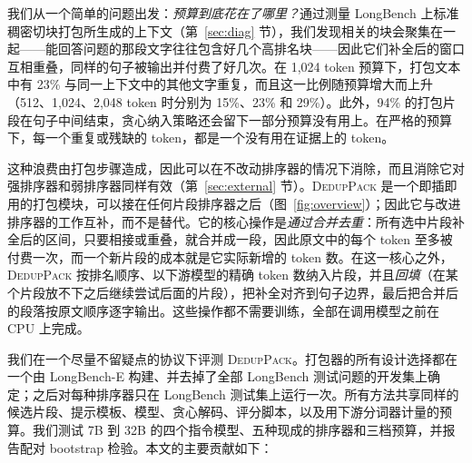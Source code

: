 \documentclass[11pt]{article}
\newcommand{\spk}{\textsc{DedupPack}}
\begin{document}
我们从一个简单的问题出发：\emph{预算到底花在了哪里？}通过测量 LongBench 上标准稠密切块打包所生成的上下文（第~\ref{sec:diag} 节），我们发现相关的块会聚集在一起——能回答问题的那段文字往往包含好几个高排名块——因此它们补全后的窗口互相重叠，同样的句子被输出并付费了好几次。在 1,024 token 预算下，打包文本中有 23\% 与同一上下文中的其他文字重复，而且这一比例随预算增大而上升（512、1,024、2,048 token 时分别为 15\%、23\% 和 29\%）。此外，94\% 的打包片段在句子中间结束，贪心纳入策略还会留下一部分预算没有用上。在严格的预算下，每一个重复或残缺的 token，都是一个没有用在证据上的 token。

这种浪费由打包步骤造成，因此可以在不改动排序器的情况下消除，而且消除它对强排序器和弱排序器同样有效（第~\ref{sec:external} 节）。\spk{} 是一个即插即用的打包模块，可以接在任何片段排序器之后（图~\ref{fig:overview}）；因此它与改进排序器的工作互补，而不是替代。它的核心操作是\emph{通过合并去重}：所有选中片段补全后的区间，只要相接或重叠，就合并成一段，因此原文中的每个 token 至多被付费一次，而一个新片段的成本就是它实际新增的 token 数。在这一核心之外，\spk{} 按排名顺序、以下游模型的精确 token 数纳入片段，并且\emph{回填}（在某个片段放不下之后继续尝试后面的片段），把补全对齐到句子边界，最后把合并后的段落按原文顺序逐字输出。这些操作都不需要训练，全部在调用模型之前在 CPU 上完成。

我们在一个尽量不留疑点的协议下评测 \spk{}。打包器的所有设计选择都在一个由 LongBench-E 构建、并去掉了全部 LongBench 测试问题的开发集上确定；之后对每种排序器只在 LongBench 测试集上运行一次。所有方法共享同样的候选片段、提示模板、模型、贪心解码、评分脚本，以及用下游分词器计量的预算。我们测试 7B 到 32B 的四个指令模型、五种现成的排序器和三档预算，并报告配对 bootstrap 检验。本文的主要贡献如下：
\end{document}
